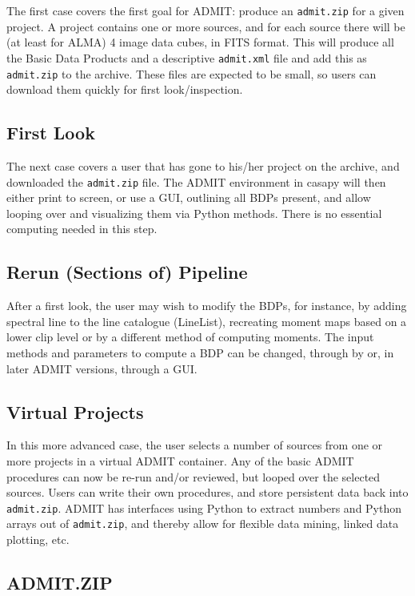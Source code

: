\documentclass{article}
\begin{document}
The first case covers the first goal for ADMIT: produce an 
{\tt admit.zip} for a given project.  A project contains one or more
sources, and for each source there will be (at least for ALMA) 4 image
data cubes, in FITS format. This will produce all the Basic Data Products
and a descriptive {\tt admit.xml} file and add this as {\tt admit.zip} to
the archive. These files are expected to be small, so users can download
them quickly for first look/inspection.


\subsection{First Look}

The next case covers a user that has gone to his/her project on the archive,
and downloaded the {\tt admit.zip} file. The ADMIT environment in casapy
will then either print to screen, or use a GUI, outlining all BDPs present, and
allow looping over and visualizing them via Python methods. There is no
essential computing needed in this step.

\subsection{Rerun (Sections of) Pipeline}

After a first look, the user may wish to modify the BDPs, for instance,
by adding spectral line to the line catalogue (LineList), recreating
moment maps based on a lower clip level or by a different method of
computing moments.  The input methods and parameters to compute a BDP
can be changed, through by or, in later ADMIT versions, through a GUI.

\subsection{Virtual Projects}

In this more advanced case, the user selects a number of sources from
one or more projects in a virtual ADMIT container. Any of the basic ADMIT
procedures can now be re-run and/or reviewed, but looped over the selected
sources.  Users can write their own procedures, and store persistent data
back into {\tt admit.zip}. ADMIT has interfaces using Python to extract
numbers and Python arrays out of {\tt admit.zip}, and thereby allow for
flexible data mining, linked data plotting, etc.

\subsection{ADMIT.ZIP}
\end{document}
